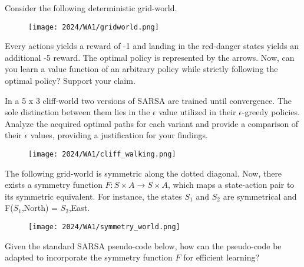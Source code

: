 \documentclass[addpoints,12pt,solution]{exam}
\begin{document}
\begin{questions}

\question[3][TD, IS] Consider the following deterministic grid-world. 

\begin{figure}[!htp]
\texttt{[image: 2024/WA1/gridworld.png]}\centering
\end{figure}

 
Every actions yields a reward of -1 and landing in the red-danger states yields an additional -5 reward. The optimal policy is represented by the arrows. Now, can you learn a value function of an arbitrary policy while strictly following the optimal policy? Support your claim.


\begin{solution}

\end{solution}

\question[1][SARSA] In a 5 x 3 cliff-world two versions of SARSA are trained until convergence. The sole distinction between them lies in the $\epsilon$ value utilized in their $\epsilon$-greedy policies. Analyze the acquired optimal paths for each variant and provide a comparison of their $\epsilon$ values, providing a justification for your findings.

\begin{figure}[!htp]
\texttt{[image: 2024/WA1/cliff\_walking.png]}\centering
\end{figure}

\begin{solution}

\end{solution}

\question[2][SARSA] The following grid-world is symmetric along the dotted diagonal. Now, there exists a symmetry function $F:S \times A \rightarrow S \times A$, which maps a state-action pair to its symmetric equivalent. For instance, the states $S_1$ and $S_2$ are symmetrical and \\ F($S_1$,North) = $S_2$,East.

\begin{figure}[!htp]
\centering \texttt{[image: 2024/WA1/symmetry\_world.png]}
\end{figure}

Given the standard SARSA pseudo-code below, how can the pseudo-code be adapted to incorporate the symmetry function $F$ for efficient learning?


\end{questions}
\end{document}
